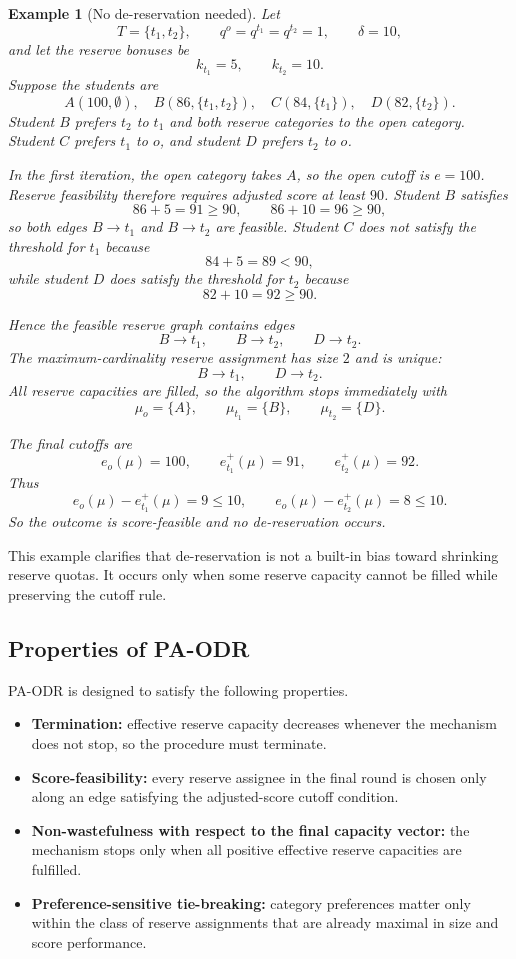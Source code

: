 \documentclass[12pt]{article}
\newtheorem{example}{Example}
\newcommand{\1}{\mathbf{1}}
\begin{document}
\begin{example}[No de-reservation needed]
Let
\[
T=\{t_1,t_2\},\qquad q^o=q^{t_1}=q^{t_2}=1,\qquad \delta=10,
\]
and let the reserve bonuses be
\[
k_{t_1}=5,\qquad k_{t_2}=10.
\]
Suppose the students are
\[
A(100,\emptyset),\quad B(86,\{t_1,t_2\}),\quad C(84,\{t_1\}),\quad D(82,\{t_2\}).
\]
Student $B$ prefers $t_2$ to $t_1$ and both reserve categories to the open category. Student $C$ prefers $t_1$ to $o$, and student $D$ prefers $t_2$ to $o$.

In the first iteration, the open category takes $A$, so the open cutoff is $e=100$. Reserve feasibility therefore requires adjusted score at least $90$. Student $B$ satisfies
\[
86+5=91\ge 90,\qquad 86+10=96\ge 90,
\]
so both edges $B\to t_1$ and $B\to t_2$ are feasible. Student $C$ does not satisfy the threshold for $t_1$ because
\[
84+5=89<90,
\]
while student $D$ does satisfy the threshold for $t_2$ because
\[
82+10=92\ge 90.
\]

Hence the feasible reserve graph contains edges
\[
B\to t_1,\qquad B\to t_2,\qquad D\to t_2.
\]
The maximum-cardinality reserve assignment has size $2$ and is unique:
\[
B\to t_1,\qquad D\to t_2.
\]
All reserve capacities are filled, so the algorithm stops immediately with
\[
\mu_o=\{A\},\qquad \mu_{t_1}=\{B\},\qquad \mu_{t_2}=\{D\}.
\]

The final cutoffs are
\[
e_o(\mu)=100,\qquad e_{t_1}^+(\mu)=91,\qquad e_{t_2}^+(\mu)=92.
\]
Thus
\[
e_o(\mu)-e_{t_1}^+(\mu)=9\le 10,\qquad e_o(\mu)-e_{t_2}^+(\mu)=8\le 10.
\]
So the outcome is score-feasible and no de-reservation occurs.
\end{example}

This example clarifies that de-reservation is not a built-in bias toward shrinking reserve quotas. It occurs only when some reserve capacity cannot be filled while preserving the cutoff rule.

\subsection{Properties of PA-ODR}
PA-ODR is designed to satisfy the following properties.

\begin{itemize}
\item \textbf{Termination:} effective reserve capacity decreases whenever the mechanism does not stop, so the procedure must terminate.
\item \textbf{Score-feasibility:} every reserve assignee in the final round is chosen only along an edge satisfying the adjusted-score cutoff condition.
\item \textbf{Non-wastefulness with respect to the final capacity vector:} the mechanism stops only when all positive effective reserve capacities are fulfilled.
\item \textbf{Preference-sensitive tie-breaking:} category preferences matter only within the class of reserve assignments that are already maximal in size and score performance.
\end{itemize}
\end{document}
